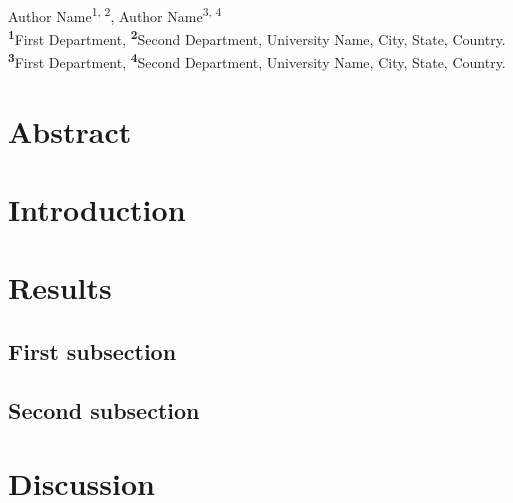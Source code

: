 \documentclass[10pt,letterpaper]{article}
\date{}
\begin{document}
\vspace*{0.2in}

\begin{flushleft}
{\Large
\textbf{}
}
\newline
\\
Author Name\textsuperscript{1, 2},
Author Name\textsuperscript{3, 4}
\\
{
\singlespacing
\small
\textsuperscript{\bf 1}First Department,
\textsuperscript{\bf 2}Second Department,
University Name, City, State, Country.\\
\medskip
\textsuperscript{\bf 3}First Department,
\textsuperscript{\bf 4}Second Department,
University Name, City, State, Country.\\
}

\end{flushleft}

\linenumbers
\lsstyle

\section*{Abstract}

\blindtext

\section*{Introduction}

\Blindtext 

\section*{Results}

\subsection*{First subsection}

\blindtext

\subsection*{Second subsection}

\blindtext

\section*{Discussion}

\Blindtext 

\printbibliography
\end{document}
